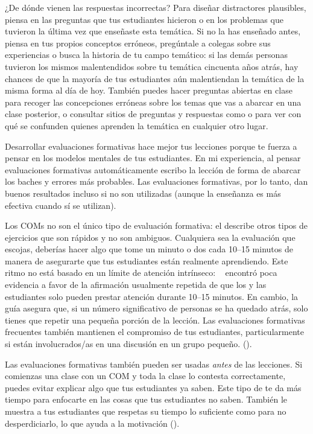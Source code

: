 \begin{aside}{¿De dónde vienen las respuestas incorrectas?}
 Para diseñar distractores plausibles,
piensa en las preguntas que tus estudiantes hicieron o en los problemas que tuvieron la última vez que enseñaste esta temática.
Si no la has enseñado antes,
piensa en tus propios conceptos erróneos,
pregúntale a colegas sobre sus experiencias
o busca la historia de tu campo temático:
si las demás personas tuvieron los mismos malentendidos sobre tu temática cincuenta años atrás,
hay chances de que la mayoría de tus estudiantes aún malentiendan la temática de la misma forma al día de hoy.
También puedes hacer preguntas abiertas en clase
para recoger las concepciones erróneas sobre los temas que vas a abarcar en una clase posterior,
o consultar sitios de preguntas y respuestas como 
  o 
  para ver con qué se confunden quienes aprenden la temática en cualquier otro lugar.
\end{aside}

Desarrollar evaluaciones formativas hace mejor tus lecciones
porque te fuerza a pensar en los modelos mentales de tus estudiantes.
En mi experiencia,
al pensar evaluaciones formativas automáticamente escribo la lección de forma de abarcar los baches y errores más probables.
Las evaluaciones formativas, por lo tanto, dan buenos resultados incluso si no son utilizadas
(aunque la enseñanza es más efectiva cuando sí se utilizan).

Los COMs no son el único tipo de evaluación formativa:
el  describe otros tipos de ejercicios que son rápidos y no son ambiguos.
Cualquiera sea la evaluación que escojas,
deberías hacer algo que tome un minuto o dos cada 10--15 minutos
de manera de asegurarte que tus estudiantes están realmente aprendiendo.
Este ritmo no está basado en un límite de atención intrínseco: ~\cite{Wils2007}
encontró poca evidencia a favor de la afirmación usualmente repetida de que
los y las estudiantes solo pueden prestar atención durante 10--15 minutos.
En cambio,
la guía asegura que, si un número significativo de personas se ha quedado atrás,
solo tienes que repetir una pequeña porción de la lección.
Las evaluaciones formativas frecuentes también mantienen el compromiso de tus estudiantes, 
particularmente si están involucrados/as en una discusión en un grupo pequeño.
().

Las evaluaciones formativas también pueden ser usadas \emph{antes} de las lecciones.
Si comienzas una clase con un COM y toda la clase lo contesta correctamente,
puedes evitar explicar algo que tus estudiantes ya saben.
Este tipo de 
te da más tiempo para enfocarte en las cosas que tus estudiantes no saben.
También le muestra a tus estudiantes que respetas su tiempo lo suficiente como para no desperdiciarlo,
lo que ayuda a la motivación ().

